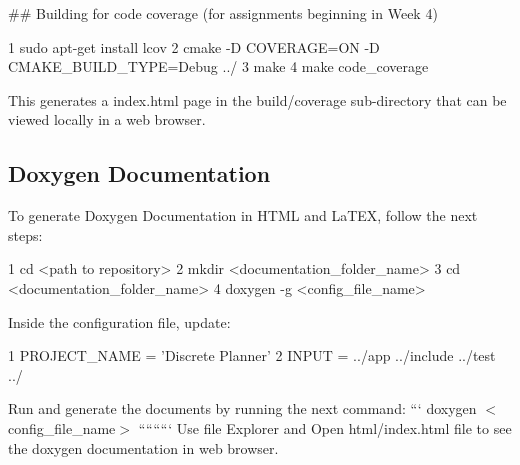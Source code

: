 \#\# Building for code coverage (for assignments beginning in Week 4) 
\begin{DoxyCode}
1 sudo apt-get install lcov
2 cmake -D COVERAGE=ON -D CMAKE\_BUILD\_TYPE=Debug ../
3 make
4 make code\_coverage
\end{DoxyCode}
 This generates a index.\+html page in the build/coverage sub-\/directory that can be viewed locally in a web browser.

\subsection*{Doxygen Documentation}

To generate Doxygen Documentation in H\+T\+ML and La\+T\+EX, follow the next steps\+: 
\begin{DoxyCode}
1 cd <path to repository>
2 mkdir <documentation\_folder\_name>
3 cd <documentation\_folder\_name>
4 doxygen -g <config\_file\_name>
\end{DoxyCode}
 Inside the configuration file, update\+: 
\begin{DoxyCode}
1 PROJECT\_NAME = 'Discrete Planner'
2 INPUT = ../app ../include ../test ../
\end{DoxyCode}
 Run and generate the documents by running the next command\+: ``` doxygen $<$config\+\_\+file\+\_\+name$>$ ````````` Use file Explorer and Open html/index.\+html file to see the doxygen documentation in web browser. 